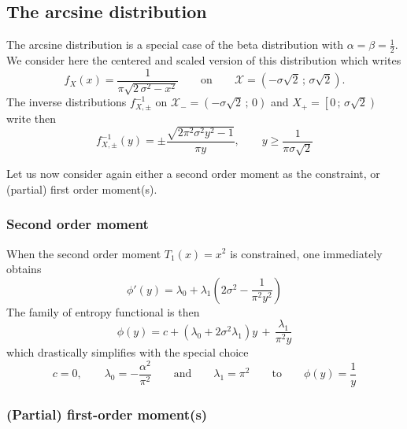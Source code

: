 \documentclass[entropy,article,submit,moreauthors,pdftex]{Definitions/mdpi}
\def\X{\mathcal{X}}
\begin{document}

\subsection{The arcsine distribution}
\label{subsec:Arcsine}

The arcsine distribution is a special case of the beta distribution with $\alpha
= \beta  = \frac12$. We  consider here the centered  and scaled version  of this
distribution which writes
%
\[
f_X(x) = \frac{1}{\pi\sqrt{  2 \, \sigma^2 - x^2}} \qquad  \mbox{on} \qquad \X =
\left( - \sigma \sqrt2 \, ; \, \sigma \sqrt2 \right).
\]
%
The inverse distributions $f_{X,\pm}^{-1}$ on $\X_-  = \left( - \sigma \sqrt2 \,
; \, 0 \right)$ and $X_+ = \left[ 0 \, ; \, \sigma \sqrt2 \right)$ write then
%
\[
f_{X,\pm}^{-1}(y) = \pm \frac{\sqrt{2 \pi^2 \sigma^2  y^2 - 1}}{\pi y}, \qquad y
\ge \frac{1}{\pi \sigma \sqrt2}
\]


Let us  now consider again  either a second order  moment as the  constraint, or
(partial) first order moment(s).



\subsubsection{Second order moment}

When the  second order  moment $T_1(x)  = x^2$  is constrained,  one immediately
obtains
%
\[
\phi'(y)=\lambda_0 + \lambda_1\left(2\sigma^{2}-\frac{1}{\pi^{2}y^{2}}\right)
\]
%
The family of entropy functional is then 
%
\[
\phi(y)  = c  +  \left( \lambda_0  +  2 \sigma^2  \lambda_1 \right)  y  \, +  \,
\frac{\lambda_1}{\pi^2 y}
\]
%
which    drastically   simplifies    with    the   special choice
%
\[
c  = 0,  \qquad \lambda_0  = -  \frac{\alpha^2}{\pi^2} \qquad  \mbox{and} \qquad
\lambda_1 = \pi^2 \qquad \mbox{to} \qquad\phi(y) = \frac{1}{y}
\]
%



\subsubsection{(Partial) first-order moment(s)}
\end{document}
